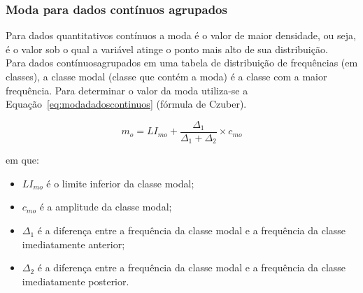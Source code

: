 \documentclass[11pt,fleqn]{book} %
\begin{document}
\subsubsection{Moda para dados contínuos agrupados}
\vspace{0,3cm}

Para dados quantitativos contínuos a moda é o valor de maior densidade, ou seja, é o valor sob o qual a variável atinge o ponto mais alto de sua distribuição. \\

Para dados contínuosagrupados em uma tabela de distribuição de frequências (em classes), a classe modal (classe que contém a moda) é a classe com a maior frequência. Para determinar o valor da moda utiliza-se a Equação~\ref{eq:modadadoscontinuos} (fórmula de Czuber). \\


\begin{eBox}
\vspace{-0.5cm}
\begin{equation} \label{eq:modadadoscontinuos}
	m_o= \displaystyle LI_{mo}+\frac{\Delta_1}{\Delta_1+\Delta_2} \times c_{mo}
\end{equation}
\end{eBox}

\vspace{0,3cm}
\noindent em que:
\vspace{0,3cm}

\begin{itemize}
\item $LI_{mo}$ é o limite inferior da classe modal;
\item $c_{mo}$ é a amplitude da classe modal;
\item $\Delta_1$ é a diferença entre a frequência da classe modal e a frequência da classe imediatamente anterior;
\item $\Delta_2$ é a diferença entre a frequência da classe modal e a frequência da classe imediatamente posterior.
\end{itemize}

\vspace{0,5cm}
\end{document}
